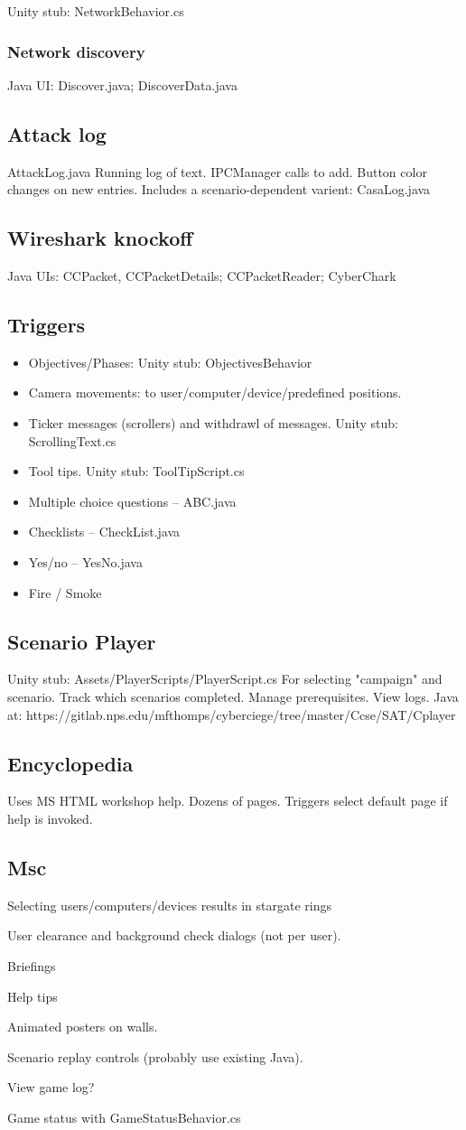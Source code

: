 \documentclass{article}
\begin{document}
Unity stub: NetworkBehavior.cs

\subsubsection{Network discovery}
Java UI:  Discover.java; DiscoverData.java

\subsection{Attack log}
AttackLog.java
Running log of text. IPCManager calls to add.  Button color changes on new entries.
Includes a scenario-dependent varient: CasaLog.java

\subsection{Wireshark knockoff}
Java UIs:
CCPacket, CCPacketDetails; CCPacketReader; CyberChark

\subsection{Triggers}
\begin{itemize}
\item Objectives/Phases: Unity stub: ObjectivesBehavior
\item Camera movements: to user/computer/device/predefined positions.
\item Ticker messages (scrollers) and withdrawl of messages. Unity stub: ScrollingText.cs
\item Tool tips.  Unity stub: ToolTipScript.cs
\item Multiple choice questions -- ABC.java
\item Checklists -- CheckList.java
\item Yes/no  -- YesNo.java
\item Fire / Smoke 
\end{itemize}

\subsection {Scenario Player}
\label{player}
Unity stub: Assets/PlayerScripts/PlayerScript.cs
For selecting "campaign" and scenario.  Track which scenarios completed.
Manage prerequisites.  View logs.
Java at:
https://gitlab.nps.edu/mfthomps/cyberciege/tree/master/Ccse/SAT/Cplayer

\subsection{Encyclopedia}
Uses MS HTML workshop help.  Dozens of pages.  Triggers select default page if help is invoked.
 
\subsection{Msc}
Selecting users/computers/devices results in stargate rings

User clearance and background check dialogs (not per user).

Briefings

Help tips

Animated posters on walls.

Scenario replay controls (probably use existing Java).

View game log?

Game status with GameStatusBehavior.cs
\end{document}
